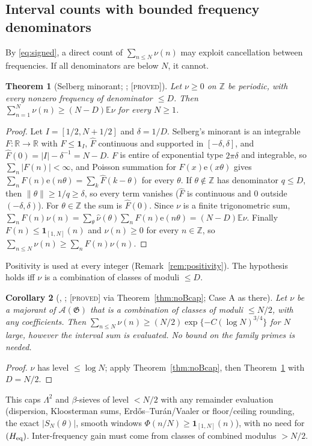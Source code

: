 \documentclass[10pt,reqno]{amsart}
\newtheorem{theorem}{Theorem}[section]
\newtheorem{corollary}[theorem]{Corollary}
\theoremstyle{definition}
\theoremstyle{remark}
\newcommand{\A}{\mathcal A}
\newcommand{\cG}{\mathfrak G}
\newcommand{\E}{\mathbb E}
\newcommand{\Z}{\mathbb Z}
\newcommand{\ind}{\mathbf 1}
\newcommand{\e}{\mathrm e}
\newcommand{\lab}[1]{\textup{[\textsc{#1}]}}
\begin{document}
\subsection{Interval counts with bounded frequency denominators}
By \eqref{eq:signed}, a direct count of $\sum_{n\leq N}\nu(n)$ may exploit
cancellation between frequencies.  If all denominators are below $N$, it
cannot.

\begin{theorem}[Selberg minorant; {\cite[Thm~2.2]{IF}}; \lab{proved}]\label{thm:IFminorant}
Let $\nu\geq0$ on $\Z$ be periodic, with every nonzero frequency of
denominator $\leq D$.  Then $\sum_{n=1}^N\nu(n)\geq(N-D)\E\nu$ for every $N\geq1$.
\end{theorem}
\begin{proof}
Let $I=[1/2,N+1/2]$ and $\delta=1/D$.  Selberg's minorant \cite{Vaaler} is an
integrable $F:\mathbb R\to\mathbb R$ with $F\leq\ind_I$, $\hat F$ continuous and
supported in $[-\delta,\delta]$, and $\hat F(0)=|I|-\delta^{-1}=N-D$.  $F$ is entire of
exponential type $2\pi\delta$ and integrable, so $\sum_n|F(n)|<\infty$, and Poisson
summation for $F(x)\e(x\theta)$ gives $\sum_nF(n)\e(n\theta)=\sum_k\hat F(k-\theta)$ for every
$\theta$.  If $\theta\notin\Z$ has denominator $q\leq D$, then $\|\theta\|\geq1/q\geq\delta$, so every
term vanishes ($\hat F$ is continuous and $0$ outside $(-\delta,\delta)$).  For $\theta\in\Z$
the sum is $\hat F(0)$.  Since $\nu$ is a finite trigonometric sum,
$\sum_nF(n)\nu(n)=\sum_\theta\hat\nu(\theta)\sum_nF(n)\e(n\theta)=(N-D)\E\nu$.  Finally
$F(n)\leq\ind_{[1,N]}(n)$ and $\nu(n)\geq0$ for every $n\in\Z$, so
$\sum_{n\leq N}\nu(n)\geq\sum_nF(n)\nu(n)$.
\end{proof}
Positivity is used at every integer (Remark~\ref{rem:positivity}).  The
hypothesis holds iff $\nu$ is a combination of classes of moduli $\leq D$.

\begin{corollary}[{\cite[Cor.~2.3]{IF}}, {\cite[\S4.3]{KA3}}; \lab{proved} via Theorem~\ref{thm:noBcap}; Case A as there]\label{cor:IFcap}
Let $\nu$ be a majorant of $\A(\cG)$ that is a combination of classes of
moduli $\leq N/2$, with any coefficients.  Then
$\sum_{n\leq N}\nu(n)\geq(N/2)\exp\{-C(\log N)^{3/4}\}$ for $N$ large, however the
interval sum is evaluated.  No bound on the family primes is needed.
\end{corollary}
\begin{proof}
$\nu$ has level $\leq\log N$; apply Theorem~\ref{thm:noBcap}, then
Theorem~\ref{thm:IFminorant} with $D=N/2$.
\end{proof}
This caps $\Lambda^2$ and $\beta$-sieves of level $<N/2$ with any remainder
evaluation (dispersion, Kloosterman sums, Erd\H{o}s--Tur\'an/Vaaler or
floor/ceiling rounding, the exact $|S_N(\theta)|$, smooth windows
$\Phi(n/N)\geq\ind_{[1,N]}(n)$), with no need for $(H_{\rm eq})$.  Inter-frequency gain
must come from classes of combined modulus $>N/2$.
\end{document}
